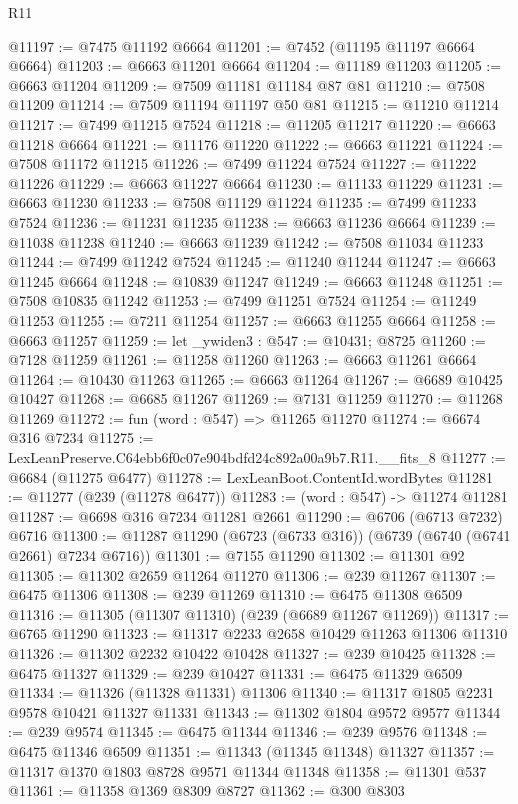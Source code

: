 \begin{lexlean}{R11}
\begin{coremodule}
@11197 := @7475 @11192 @6664
@11201 := @7452 (@11195 @11197 @6664 @6664)
@11203 := @6663 @11201 @6664
@11204 := @11189 @11203
@11205 := @6663 @11204
@11209 := @7509 @11181 @11184 @87 @81
@11210 := @7508 @11209
@11214 := @7509 @11194 @11197 @50 @81
@11215 := @11210 @11214
@11217 := @7499 @11215 @7524
@11218 := @11205 @11217
@11220 := @6663 @11218 @6664
@11221 := @11176 @11220
@11222 := @6663 @11221
@11224 := @7508 @11172 @11215
@11226 := @7499 @11224 @7524
@11227 := @11222 @11226
@11229 := @6663 @11227 @6664
@11230 := @11133 @11229
@11231 := @6663 @11230
@11233 := @7508 @11129 @11224
@11235 := @7499 @11233 @7524
@11236 := @11231 @11235
@11238 := @6663 @11236 @6664
@11239 := @11038 @11238
@11240 := @6663 @11239
@11242 := @7508 @11034 @11233
@11244 := @7499 @11242 @7524
@11245 := @11240 @11244
@11247 := @6663 @11245 @6664
@11248 := @10839 @11247
@11249 := @6663 @11248
@11251 := @7508 @10835 @11242
@11253 := @7499 @11251 @7524
@11254 := @11249 @11253
@11255 := @7211 @11254
@11257 := @6663 @11255 @6664
@11258 := @6663 @11257
@11259 := let _ywiden3 : @547 := @10431; @8725
@11260 := @7128 @11259
@11261 := @11258 @11260
@11263 := @6663 @11261 @6664
@11264 := @10430 @11263
@11265 := @6663 @11264
@11267 := @6689 @10425 @10427
@11268 := @6685 @11267
@11269 := @7131 @11259
@11270 := @11268 @11269
@11272 := fun (word : @547) => @11265 @11270
@11274 := @6674 @316 @7234
@11275 := LexLeanPreserve.C64ebb6f0c07e904bdfd24c892a00a9b7.R11.__fits_8
@11277 := @6684 (@11275 @6477)
@11278 := LexLeanBoot.ContentId.wordBytes
@11281 := @11277 (@239 (@11278 @6477))
@11283 := (word : @547) -> @11274 @11281
@11287 := @6698 @316 @7234 @11281 @2661
@11290 := @6706 (@6713 @7232) @6716
@11300 := @11287 @11290 (@6723 (@6733 @316)) (@6739 (@6740 (@6741 @2661) @7234 @6716))
@11301 := @7155 @11290
@11302 := @11301 @92
@11305 := @11302 @2659 @11264 @11270
@11306 := @239 @11267
@11307 := @6475 @11306
@11308 := @239 @11269
@11310 := @6475 @11308 @6509
@11316 := @11305 (@11307 @11310) (@239 (@6689 @11267 @11269))
@11317 := @6765 @11290
@11323 := @11317 @2233 @2658 @10429 @11263 @11306 @11310
@11326 := @11302 @2232 @10422 @10428
@11327 := @239 @10425
@11328 := @6475 @11327
@11329 := @239 @10427
@11331 := @6475 @11329 @6509
@11334 := @11326 (@11328 @11331) @11306
@11340 := @11317 @1805 @2231 @9578 @10421 @11327 @11331
@11343 := @11302 @1804 @9572 @9577
@11344 := @239 @9574
@11345 := @6475 @11344
@11346 := @239 @9576
@11348 := @6475 @11346 @6509
@11351 := @11343 (@11345 @11348) @11327
@11357 := @11317 @1370 @1803 @8728 @9571 @11344 @11348
@11358 := @11301 @537
@11361 := @11358 @1369 @8309 @8727
@11362 := @300 @8303

\end{coremodule}
\end{lexlean}
